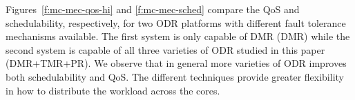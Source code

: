 	
	Figures~\ref{f:mc-mec-qos-hi} and \ref{f:mc-mec-sched} compare the QoS and schedulability, respectively, for two ODR platforms with different fault tolerance mechanisms available. The first system is only capable of DMR (DMR) while the second system is capable of all three varieties of ODR studied in this paper (DMR+TMR+PR). We observe that in general more varieties of ODR improves both schedulability and QoS. The different techniques provide greater flexibility in how to distribute the workload across the cores. 
	
